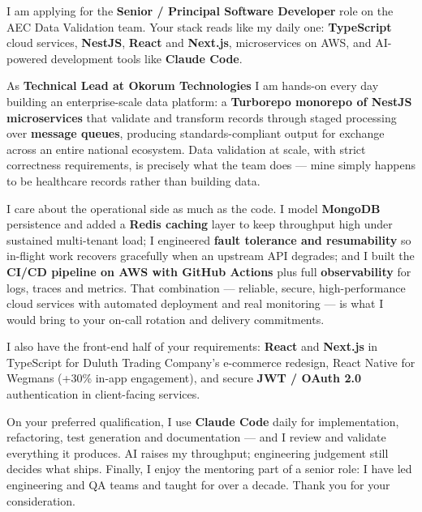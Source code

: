 \documentclass[11pt,a4paper]{awesome-cv}
\begin{document}
\makecvheader[R]
\makelettertitle

\begin{cvletter}

I am applying for the \textbf{Senior / Principal Software Developer} role on the AEC Data Validation team. Your stack reads like my daily one: \textbf{TypeScript} cloud services, \textbf{NestJS}, \textbf{React} and \textbf{Next.js}, microservices on AWS, and AI-powered development tools like \textbf{Claude Code}.

As \textbf{Technical Lead at Okorum Technologies} I am hands-on every day building an enterprise-scale data platform: a \textbf{Turborepo monorepo of NestJS microservices} that validate and transform records through staged processing over \textbf{message queues}, producing standards-compliant output for exchange across an entire national ecosystem. Data validation at scale, with strict correctness requirements, is precisely what the team does --- mine simply happens to be healthcare records rather than building data.

I care about the operational side as much as the code. I model \textbf{MongoDB} persistence and added a \textbf{Redis caching} layer to keep throughput high under sustained multi-tenant load; I engineered \textbf{fault tolerance and resumability} so in-flight work recovers gracefully when an upstream API degrades; and I built the \textbf{CI/CD pipeline on AWS with GitHub Actions} plus full \textbf{observability} for logs, traces and metrics. That combination --- reliable, secure, high-performance cloud services with automated deployment and real monitoring --- is what I would bring to your on-call rotation and delivery commitments.

I also have the front-end half of your requirements: \textbf{React} and \textbf{Next.js} in TypeScript for Duluth Trading Company's e-commerce redesign, React Native for Wegmans (+30\% in-app engagement), and secure \textbf{JWT / OAuth 2.0} authentication in client-facing services.

On your preferred qualification, I use \textbf{Claude Code} daily for implementation, refactoring, test generation and documentation --- and I review and validate everything it produces. AI raises my throughput; engineering judgement still decides what ships. Finally, I enjoy the mentoring part of a senior role: I have led engineering and QA teams and taught for over a decade. Thank you for your consideration.

\end{cvletter}

\makeletterclosing
\end{document}
